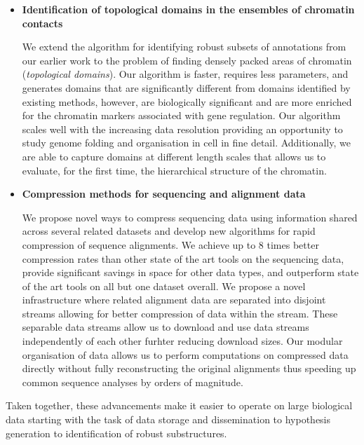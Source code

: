 \begin{itemize}
  \item \textbf{Identification of topological domains in the ensembles of chromatin contacts}

  We extend the algorithm for identifying robust subsets of annotations from our earlier work to the problem of finding densely packed areas of chromatin (\textit{topological domains}). Our algorithm is faster, requires less parameters, and generates domains that are significantly different from domains identified by existing methods, however, are biologically significant and are more enriched for the chromatin markers associated with gene regulation. Our algorithm scales well with the increasing data resolution providing an opportunity to study genome folding and organisation in cell in fine detail. Additionally, we are able to capture domains at different length scales that allows us to evaluate, for the first time, the hierarchical structure of the chromatin.

  \item \textbf{Compression methods for sequencing and alignment data}

  We propose novel ways to compress sequencing data using information shared across several related datasets and develop new algorithms for rapid compression of sequence alignments. We achieve up to 8 times better compression rates than other state of the art tools on the sequencing data, provide significant savings in space for other data types, and outperform state of the art tools on all but one dataset overall. We propose a novel infrastructure where related alignment data are separated into disjoint streams allowing for better compression of data within the stream. These separable data streams allow us to download and use data streams independently of each other furhter reducing download sizes. Our modular organisation of data allows us to perform computations on compressed data directly without fully reconstructing the original alignments thus speeding up common sequence analyses by orders of magnitude.

\end{itemize}

Taken together, these advancements make it easier to operate on large biological data starting with the task of data storage and dissemination to hypothesis generation to identification of robust substructures.